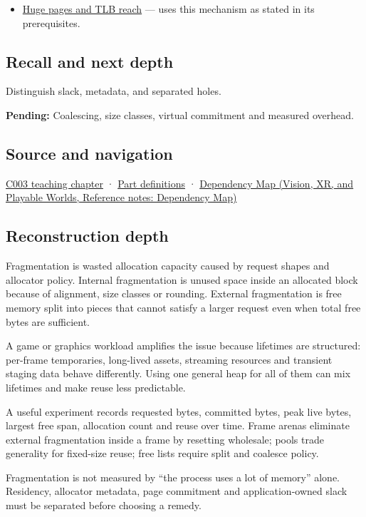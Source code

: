 \begin{itemize}
\tightlist
\item
  \hyperref[appendix-ce688d1acdab]{Huge pages and TLB reach} --- uses this mechanism as stated in its prerequisites.
\end{itemize}

\subsection{Recall and next depth}\label{appendix-a7c50686d81f-recall-and-next-depth}

\hypertarget{appendix-a7c50686d81f-recall-and-next-depth}{}

Distinguish slack, metadata, and separated holes.

\textbf{Pending:} Coalescing, size classes, virtual commitment and measured overhead.

\subsection{Source and navigation}\label{appendix-a7c50686d81f-source-and-navigation}

\hypertarget{appendix-a7c50686d81f-source-and-navigation}{}

\hyperref[01-foundations-i-ch002-where-the-bytes-live]{C003 teaching chapter} · \hyperref[appendix-fd090d982a15-m003---parts-41-60]{Part definitions} · \href{../07-Vision-XR-and-Playable-Worlds/main.pdf\#nameddest=appendix-4ad47bdd269a}{Dependency Map (Vision, XR, and Playable Worlds, Reference notes: Dependency Map)}

\subsection{Reconstruction depth}\label{appendix-a7c50686d81f-reconstruction-depth}

\hypertarget{appendix-a7c50686d81f-reconstruction-depth}{}

Fragmentation is wasted allocation capacity caused by request shapes and allocator policy. Internal fragmentation is unused space inside an allocated block because of alignment, size classes or rounding. External fragmentation is free memory split into pieces that cannot satisfy a larger request even when total free bytes are sufficient.

A game or graphics workload amplifies the issue because lifetimes are structured: per-frame temporaries, long-lived assets, streaming resources and transient staging data behave differently. Using one general heap for all of them can mix lifetimes and make reuse less predictable.

A useful experiment records requested bytes, committed bytes, peak live bytes, largest free span, allocation count and reuse over time. Frame arenas eliminate external fragmentation inside a frame by resetting wholesale; pools trade generality for fixed-size reuse; free lists require split and coalesce policy.

Fragmentation is not measured by ``the process uses a lot of memory'' alone. Residency, allocator metadata, page commitment and application-owned slack must be separated before choosing a remedy.
